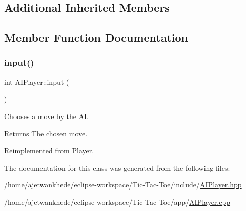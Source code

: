 \subsection*{Additional Inherited Members}


\subsection{Member Function Documentation}
\mbox{\label{classAIPlayer_a4a431bc5cf71781bdd311b08c47d27dc}} 
\subsubsection{\texorpdfstring{input()}{input()}}
{\footnotesize\ttfamily int A\+I\+Player\+::input (\begin{DoxyParamCaption}{ }\end{DoxyParamCaption})\hspace{0.3cm}{\ttfamily [virtual]}}



Chooses a move by the AI. 

\begin{DoxyReturn}{Returns}
The chosen move. 
\end{DoxyReturn}


Reimplemented from \mbox{\hyperlink{classPlayer_a3e7c5ce7c59c8b5cc9d0b985a1baae91}{Player}}.



The documentation for this class was generated from the following files\+:\begin{DoxyCompactItemize}
\item 
/home/ajetwankhede/eclipse-\/workspace/\+Tic-\/\+Tac-\/\+Toe/include/\mbox{\hyperlink{AIPlayer_8hpp}{A\+I\+Player.\+hpp}}\item 
/home/ajetwankhede/eclipse-\/workspace/\+Tic-\/\+Tac-\/\+Toe/app/\mbox{\hyperlink{AIPlayer_8cpp}{A\+I\+Player.\+cpp}}\end{DoxyCompactItemize}
